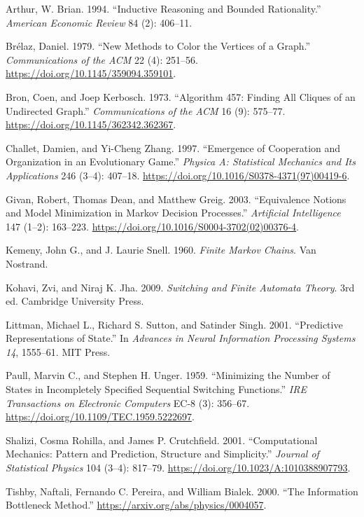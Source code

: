 \documentclass[
  11pt,
]{article}
\newlength{\cslhangindent}
\newlength{\cslentryspacingunit} %
\newenvironment{CSLReferences}[2] %
 {%
  \setlength{\parindent}{0pt}
  \ifodd #1
  \let\oldpar\par
  \def\par{\hangindent=\cslhangindent\oldpar}
  \fi
  \setlength{\parskip}{#2\cslentryspacingunit}
 }%
 {}
\begin{document}
\hypertarget{refs}{}
\begin{CSLReferences}{1}{0}
\leavevmode{}%
Arthur, W. Brian. 1994. {``Inductive Reasoning and Bounded
Rationality.''} \emph{American Economic Review} 84 (2): 406--11.

\leavevmode{}%
Brélaz, Daniel. 1979. {``New Methods to Color the Vertices of a
Graph.''} \emph{Communications of the ACM} 22 (4): 251--56.
\url{https://doi.org/10.1145/359094.359101}.

\leavevmode{}%
Bron, Coen, and Joep Kerbosch. 1973. {``Algorithm 457: Finding All
Cliques of an Undirected Graph.''} \emph{Communications of the ACM} 16
(9): 575--77. \url{https://doi.org/10.1145/362342.362367}.

\leavevmode{}%
Challet, Damien, and Yi-Cheng Zhang. 1997. {``Emergence of Cooperation
and Organization in an Evolutionary Game.''} \emph{Physica A:
Statistical Mechanics and Its Applications} 246 (3--4): 407--18.
\url{https://doi.org/10.1016/S0378-4371(97)00419-6}.

\leavevmode{}%
Givan, Robert, Thomas Dean, and Matthew Greig. 2003. {``Equivalence
Notions and Model Minimization in {M}arkov Decision Processes.''}
\emph{Artificial Intelligence} 147 (1--2): 163--223.
\url{https://doi.org/10.1016/S0004-3702(02)00376-4}.

\leavevmode{}%
Kemeny, John G., and J. Laurie Snell. 1960. \emph{Finite Markov Chains}.
Van Nostrand.

\leavevmode{}%
Kohavi, Zvi, and Niraj K. Jha. 2009. \emph{Switching and Finite Automata
Theory}. 3rd ed. Cambridge University Press.

\leavevmode{}%
Littman, Michael L., Richard S. Sutton, and Satinder Singh. 2001.
{``Predictive Representations of State.''} In \emph{Advances in Neural
Information Processing Systems 14}, 1555--61. MIT Press.

\leavevmode{}%
Paull, Marvin C., and Stephen H. Unger. 1959. {``Minimizing the Number
of States in Incompletely Specified Sequential Switching Functions.''}
\emph{IRE Transactions on Electronic Computers} EC-8 (3): 356--67.
\url{https://doi.org/10.1109/TEC.1959.5222697}.

\leavevmode{}%
Shalizi, Cosma Rohilla, and James P. Crutchfield. 2001. {``Computational
Mechanics: Pattern and Prediction, Structure and Simplicity.''}
\emph{Journal of Statistical Physics} 104 (3--4): 817--79.
\url{https://doi.org/10.1023/A:1010388907793}.

\leavevmode{}%
Tishby, Naftali, Fernando C. Pereira, and William Bialek. 2000. {``The
Information Bottleneck Method.''}
\url{https://arxiv.org/abs/physics/0004057}.

\end{CSLReferences}
\end{document}
